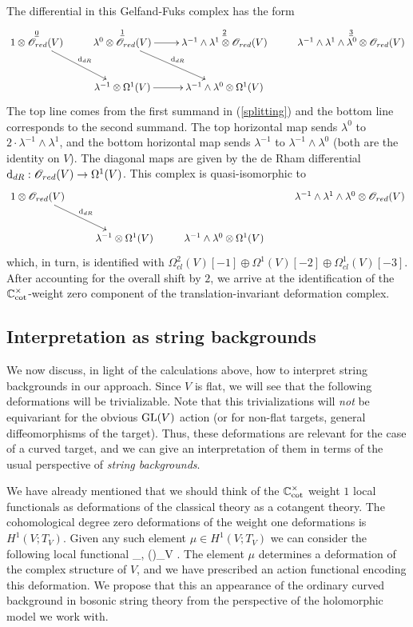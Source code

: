 The differential in this Gelfand-Fuks complex has the form
\[
\xymatrix{
\overset{\ul{0}}{1 \otimes \sO_{red}(V)} \ar[rd]^{\d_{dR}} & \overset{\ul{1}}{\lambda^0 \otimes \sO_{red}(V)} \ar[r] \ar[rd]^{\d_{dR}} & \overset{\ul{2}}{\lambda^{-1} \wedge \lambda^1 \otimes \sO_{red}(V)} & \overset{\ul{3}}{\lambda^{-1} \wedge \lambda^1 \wedge \lambda^0 \otimes \sO_{red}(V)} \\
 & \lambda^{-1} \otimes \Omega^1(V) \ar[r] & \lambda^{-1} \wedge \lambda^0 \otimes\Omega^1(V) &
}
\]
The top line comes from the first summand in (\ref{splitting}) and the bottom line corresponds to the second summand.
The top horizontal map sends $\lambda^0$ to $2 \cdot \lambda^{-1} \wedge \lambda^1$, 
and the bottom horizontal map sends $\lambda^{-1}$ to $\lambda^{-1} \wedge \lambda^0$ (both are the identity on $V$). 
The diagonal maps are given by the de Rham differential ${\rm d}_{dR} : \mathscr O_{red}(V) \to \Omega^1(V)$. 
This complex is quasi-isomorphic to 
\[
\xymatrix{
1 \otimes \sO_{red}(V) \ar[rd]^{\d_{dR}} & & & \lambda^{-1} \wedge \lambda^1 \wedge \lambda^0 \otimes \sO_{red}(V) \\
 & \lambda^{-1} \otimes \Omega^1(V) & \lambda^{-1} \wedge \lambda^0 \otimes\Omega^1(V) &
}
\]
which, in turn, is identified with $\Omega^{2}_{cl}(V)[-1] \oplus \Omega^1(V)[-2] \oplus \Omega^1_{cl}(V)[-3]$. 
After accounting for the overall shift by $2$, 
we arrive at the identification of the $\mathbb C_{\rm cot}^\times$-weight zero component of the translation-invariant deformation complex.

\subsection{Interpretation as string backgrounds}

We now discuss, in light of the calculations above, how to interpret string backgrounds in our approach. 
Since $V$ is flat,
we will see that the following deformations will be trivializable. 
Note that this trivializations will {\em not} be equivariant for the obvious ${\rm GL}(V)$ action (or for non-flat targets, general diffeomorphisms of the target). 
Thus, these deformations are relevant for the case of a curved target, and we can give an interpretation of them in terms of the usual perspective of {\em string backgrounds}. 

We have already mentioned that we should think of the $\mathbb C^\times_{\rm cot}$ weight $1$ local functionals as deformations of the classical theory as a cotangent theory.
The cohomological degree zero deformations of the weight one deformations is $H^1(V ; T_V)$. 
Given any such element $\mu \in H^1(V ; T_V)$ we can consider the following local functional
\ben
\int_\Sigma \<\beta, \mu(\gamma)\>_V .
\een 
The element $\mu$ determines a deformation of the complex structure of $V$, and we have prescribed an action functional encoding this deformation. 
We propose that this an appearance of the ordinary curved background in bosonic string theory from the perspective of the holomorphic model we work with.

